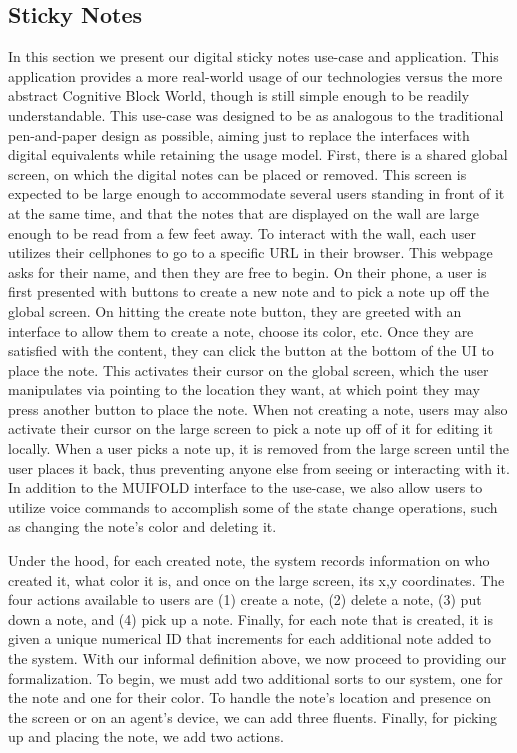 \subsection{Sticky Notes}

In this section we present our digital sticky notes use-case and application. This
application provides a more real-world usage of our technologies versus the more
abstract Cognitive Block World, though is still simple enough to be readily
understandable. This use-case was designed to be as analogous to the traditional
pen-and-paper design as possible, aiming just to replace the interfaces with digital
equivalents while retaining the usage model. First, there is a shared global screen,
on which the digital notes can be placed or removed. This screen is expected to be
large enough to
accommodate several users standing in front of it at the same time, and that the notes
that are displayed on the wall are large enough to be read from a few feet away. To
interact with the wall, each user utilizes their cellphones to go to a specific URL in
their browser. This webpage asks for their name, and then they are free to begin. On
their phone, a user is first presented with buttons to create a new note and to pick
a note up off the global screen. On hitting the create note button, they are greeted
with an interface to allow them to create a note, choose its color, etc. Once they are
satisfied with the content, they can click the button at the bottom of the UI to place
the note. This activates their cursor on the global screen, which the user manipulates
via pointing to the location they want, at which point they may press another button
to place the note. When not creating a note, users may also activate their cursor on
the large screen to pick a note up off of it for editing it locally. When a user picks
a note up, it is removed from the large screen until the user places it back, thus
preventing anyone else from seeing or interacting with it. In addition to the MUIFOLD
interface to the use-case, we also allow users to utilize voice commands to accomplish
some of the state change operations, such as changing the note's color and deleting it.

Under the hood, for each created note, the system records information on who created it,
what color it is, and once on the large screen, its x,y coordinates. The four actions
available to users are (1) create a note, (2) delete a note, (3) put down a note, and (4)
pick up a note. Finally, for each note that is created, it is given a unique numerical
ID that increments for each additional note added to the system. With our informal definition 
above, we now proceed to providing our formalization. To begin, we must add two additional
sorts to our system, one for the note and one for their color. To handle the note's location
and presence on the screen or on an agent's device, we can add three fluents. Finally,
for picking up and placing the note, we add two actions.

